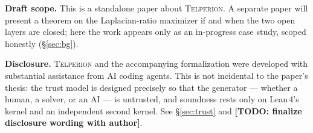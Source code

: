 \documentclass[11pt]{article}
\newcommand{\todo}[1]{{\color{red}\textbf{[TODO: #1]}}}
\theoremstyle{definition}
\theoremstyle{plain}
\newcommand{\Telperion}{\textsc{Telperion}}
\newcommand{\Lean}{Lean\,4}
\begin{document}
\medskip
\noindent\textbf{Draft scope.} This is a standalone paper about \Telperion. A
separate paper will present a theorem on the Laplacian-ratio maximizer if and
when the two open layers are closed; here the work appears only as an in-progress
case study, scoped honestly (\S\ref{sec:bg}).

\medskip
\noindent\textbf{Disclosure.} \Telperion{} and the accompanying formalization
were developed with substantial assistance from AI coding agents. This is not
incidental to the paper's thesis: the trust model is designed precisely so that
the generator --- whether a human, a solver, or an AI --- is untrusted, and
soundness rests only on \Lean's kernel and an independent second kernel. See
\S\ref{sec:trust} and \todo{finalize disclosure wording with author}.










\appendix




\end{document}
